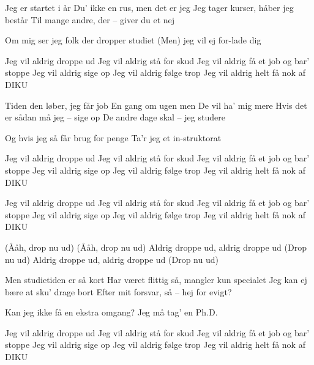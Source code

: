 \documentclass[pdftex,12pt]{article}
\begin{document}
\begin{songs}{}
\beginverse
	    Jeg er startet i år
            Du' ikke en rus, men det er jeg
            Jeg tager kurser, håber jeg består
            Til mange andre, der -- giver du et nej

\endverse
\beginverse
            Om mig ser jeg folk der dropper studiet
            (Men) jeg vil ej for-lade dig

\endverse
\beginverse
            Jeg vil aldrig droppe ud
            Jeg vil aldrig stå for skud
            Jeg vil aldrig få et job og bar' stoppe
            Jeg vil aldrig sige op
            Jeg vil aldrig følge trop
            Jeg vil aldrig helt få nok af DIKU

\endverse
\beginverse
            Tiden den løber, jeg får job
            En gang om ugen men
            De vil ha' mig mere
            Hvis det er sådan må jeg -- sige op
            De andre dage skal -- jeg studere

\endverse
\beginverse
            Og hvis jeg så får brug for penge
            Ta'r jeg et in-struktorat

\endverse
\beginverse
            Jeg vil aldrig droppe ud
            Jeg vil aldrig stå for skud
            Jeg vil aldrig få et job og bar' stoppe
            Jeg vil aldrig sige op
            Jeg vil aldrig følge trop
            Jeg vil aldrig helt få nok af DIKU

\endverse
\beginverse
            Jeg vil aldrig droppe ud
            Jeg vil aldrig stå for skud
            Jeg vil aldrig få et job og bar' stoppe
            Jeg vil aldrig sige op
            Jeg vil aldrig følge trop
            Jeg vil aldrig helt få nok af DIKU

\endverse
\beginverse
            (Ååh, drop nu ud)
            (Ååh, drop nu ud)
            Aldrig droppe ud, aldrig droppe ud
            (Drop nu ud)
            Aldrig droppe ud, aldrig droppe ud
            (Drop nu ud)

\endverse
\beginverse
            Men studietiden er så kort
            Har været flittig så,
            mangler kun specialet
            Jeg kan ej bære at sku' drage bort
            Efter mit forsvar, så -- hej for evigt?

\endverse
\beginverse
            Kan jeg ikke få en ekstra omgang?
            Jeg må tag' en Ph.D.

\endverse
\beginverse
            Jeg vil aldrig droppe ud
            Jeg vil aldrig stå for skud
            Jeg vil aldrig få et job og bar' stoppe
            Jeg vil aldrig sige op
            Jeg vil aldrig følge trop
            Jeg vil aldrig helt få nok af DIKU


\end{songs}
\end{document}
